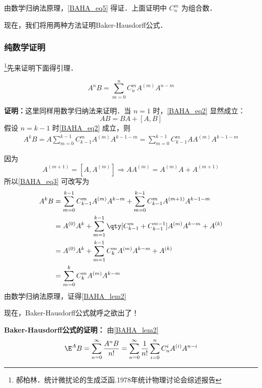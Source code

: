 由数学归纳法原理，\autoref{BAHA_eq5} 得证．上面证明中 $C_n^m$ 为组合数．

现在，我们将用两种方法证明Baker-Hausdorff公式．
\subsubsection{纯数学证明}
\footnote{郝柏林．统计微扰论的生成泛函.1978年统计物理讨论会综述报告}先来证明下面得引理．
\begin{lemma}{}\label{BAHA_lem2}
\begin{equation}\label{BAHA_eq2}
A^nB=\sum_{m=0}^{n}C_{n}^mA^{(m)}A^{n-m}
\end{equation}
\end{lemma}
\textbf{证明：}这里同样用数学归纳法来证明．当 $n=1$ 时，\autoref{BAHA_eq2} 显然成立：
\begin{equation}
AB=BA+[A,B]
\end{equation}
假设 $n=k-1$ 时\autoref{BAHA_eq2} 成立，则
\begin{equation}\label{BAHA_eq3}
\begin{aligned}
A^{k}B=A\sum_{m=0}^{k-1}C_{k-1}^mA^{(m)}A^{k-1-m}=\sum_{m=0}^{k-1}C_{k-1}^mAA^{(m)}A^{k-1-m}
\end{aligned}
\end{equation}

因为
\begin{equation}
A^{(m+1)}=[A,A^{(m)}]\Rightarrow AA^{(m)}=A^{(m)}A+A^{(m+1)}
\end{equation}
所以\autoref{BAHA_eq3} 可改写为
\begin{equation}
\begin{aligned}
A^k B&=\sum_{m=0}^{k-1}C_{k-1}^mA^{(m)}A^{k-m}+\sum_{m=0}^{k-1}C_{k-1}^mA^{(m+1)}A^{k-1-m}\\
&=A^{(0)}A^{k}+\sum_{m=1}^{k-1}\qty[C_{k-1}^m+C_{k-1}^{m-1}]A^{(m)}A^{k-m}+A^{(k)}\\
&=A^{(0)}A^{k}+\sum_{m=1}^{k-1}C_{k}^mA^{(m)}A^{k-m}+A^{(k)}\\
&=\sum_{m=0}^{k}C_{k}^mA^{(m)}A^{k-m}
\end{aligned}
\end{equation}
由数学归纳法原理，证得\autoref{BAHA_lem2} 

现在，Baker-Hausdorff公式就呼之欲出了！

\textbf{Baker-Hausdorff公式的证明：}
由\autoref{BAHA_lem2} 
\begin{equation}\label{BAHA_eq4}
\E^A B=\sum_{n=0}^{\infty}\frac{A^nB}{n!}=\sum_{n=0}^{\infty}\frac{1}{n!}\sum_{i=0}^{n}C_{n}^iA^{(i)}A^{n-i}
\end{equation}

